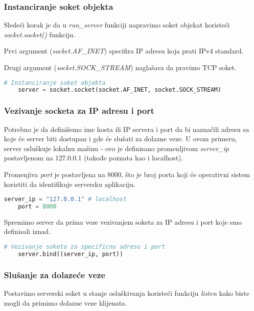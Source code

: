 \subsubsection{Instanciranje soket objekta}
Sledeći korak je da u \emph{run\_server} funkciji napravimo soket objekat koristeći \emph{socket.socket()} funkciju.

Prvi argument (\emph{socket.AF\_INET}) specifira IP adresu koja prati IPv4 standard.

Drugi argument (\emph{socket.SOCK\_STREAM}) naglašava da pravimo TCP soket.

\vspace{0.5cm}

\begin{lstlisting}[language = Python]
    # Instanciranje soket objekta
    server = socket.socket(socket.AF_INET, socket.SOCK_STREAM)
\end{lstlisting}

\subsubsection{Vezivanje socketa za IP adresu i port}
Potrebno je da definišemo ime hosta ili IP servera i port da bi naznačili adresu sa koje će server biti dostupan i gde će slušati za dolazne veze. U ovom primeru, server osluškuje lokalnu mašinu - ovo je definisano promenljivom \emph{server\_ip} postavljenom na 127.0.0.1 (takođe poznata kao i localhost).

Promenjiva \emph{port} je postavljena na 8000, što je broj porta koji će operativni sistem koristiti da identifikuje serversku aplikaciju.

\vspace{0.5cm}

\begin{lstlisting}[language = Python]
    server_ip = "127.0.0.1" # localhost
    port = 8000
\end{lstlisting}

Spremimo server da prima veze vezivanjem soketa za IP adresu i port koje smo definisali iznad.

\vspace{0.5cm}

\begin{lstlisting}[language = Python]
    # Vezivanje soketa za specificnu adresu i port
    server.bind((server_ip, port))
\end{lstlisting}

\subsubsection{Slušanje za dolazeće veze}
Postavimo serverski soket u stanje osluškivanja koristeći funkciju \emph{listen} kako biste mogli da primimo dolazne veze klijenata.

